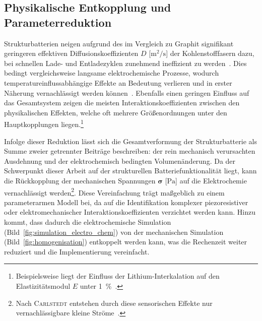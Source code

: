 \subsection{Physikalische Entkopplung und Parameterreduktion}
Strukturbatterien neigen aufgrund des im Vergleich zu Graphit signifikant geringeren effektiven Diffusionskoeffizienten $D$ [$\si{\metre\squared\per\second}$] der Kohlenstofffasern dazu, bei schnellen Lade- und Entladezyklen zunehmend ineffizient zu werden~\cite{Uchida1996,Kim2021}. Dies bedingt vergleichsweise langsame elektrochemische Prozesse, wodurch temperatureinflussabhängige Effekte an Bedeutung verlieren und in erster Näherung vernachlässigt werden können~\cite{Carlstedt2019a}. Ebenfalls einen geringen Einfluss auf das Gesamtsystem zeigen die meisten Interaktionskoeffizienten zwischen den physikalischen Effekten, welche oft mehrere Größenordnungen unter den Hauptkopplungen liegen.\footnote{Beispielsweise liegt der Einfluss der Lithium-Interkalation auf den Elastizitätsmodul $E$ unter 1~\%~\cite{Carlstedt2019}.}

Infolge dieser Reduktion lässt sich die Gesamtverformung der Strukturbatterie als Summe zweier getrennter Beiträge beschreiben: der rein mechanisch verursachten Ausdehnung und der elektrochemisch bedingten Volumenänderung. Da der Schwerpunkt dieser Arbeit auf der strukturellen Batteriefunktionalität liegt, kann die Rückkopplung der mechanischen Spannungen $\boldsymbol{\sigma}$ [$\si{\pascal}$] auf die Elektrochemie vernachlässigt werden\footnote{Nach \textsc{Carlstedt} entstehen durch diese sensorischen Effekte nur vernachlässigbare kleine Ströme~\cite{Carlstedt2023}.}. Diese Vereinfachung trägt maßgeblich zu einem parameterarmen Modell bei, da auf die Identifikation komplexer piezoresistiver oder elektromechanischer Interaktionskoeffizienten verzichtet werden kann. Hinzu kommt, dass dadurch die elektrochemische Simulation (Bild~\ref{fig:simulation_electro_chem}) von der mechanischen Simulation (Bild~\ref{fig:homogenisation}) entkoppelt werden kann, was die Rechenzeit weiter reduziert und die Implementierung vereinfacht.

